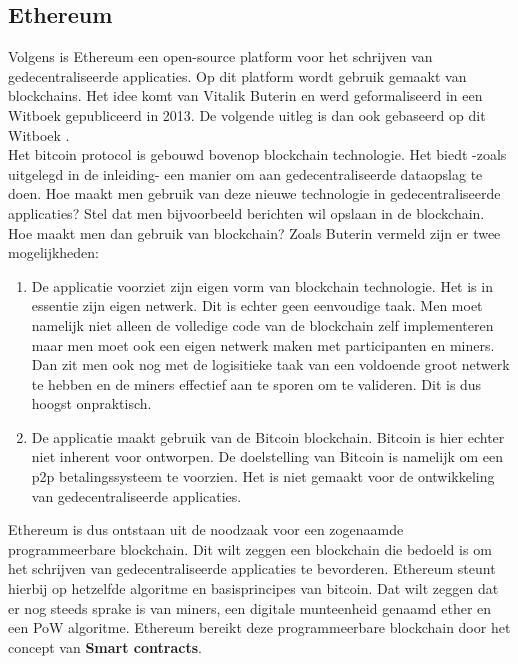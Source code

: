 \subsection{Ethereum}
Volgens \cite{EthFound2020} is Ethereum een open-source platform voor het schrijven van gedecentraliseerde applicaties. Op dit platform wordt gebruik gemaakt van blockchains. Het idee komt van Vitalik Buterin en werd geformaliseerd in een Witboek gepubliceerd in 2013. De volgende uitleg is dan ook gebaseerd op dit Witboek \cite{Buterin2015}.\\

Het bitcoin protocol is gebouwd bovenop blockchain technologie. Het biedt -zoals uitgelegd in de inleiding- een manier om aan gedecentraliseerde dataopslag te doen. Hoe maakt men gebruik van deze nieuwe technologie in gedecentraliseerde applicaties? Stel dat men bijvoorbeeld berichten wil opslaan in de blockchain. Hoe maakt men dan gebruik van blockchain? Zoals Buterin vermeld zijn er twee mogelijkheden:

\begin{enumerate}
\item De applicatie voorziet zijn eigen vorm van blockchain technologie. Het is in essentie zijn eigen netwerk. Dit is echter geen eenvoudige taak. Men moet namelijk niet alleen de volledige code van de blockchain zelf  implementeren maar men moet ook een eigen netwerk maken met participanten en miners. Dan zit men ook nog met de logisitieke taak van een voldoende groot netwerk te hebben en de miners effectief aan te sporen om te valideren. Dit is dus hoogst onpraktisch.\\
\item De applicatie maakt gebruik van de Bitcoin blockchain. Bitcoin is hier echter niet inherent voor ontworpen. De doelstelling van Bitcoin is namelijk om een p2p betalingssysteem te voorzien. Het is niet gemaakt voor de ontwikkeling van gedecentraliseerde applicaties.\\
\end{enumerate}

Ethereum is dus ontstaan uit de noodzaak voor een zogenaamde programmeerbare blockchain. Dit wilt zeggen een blockchain die bedoeld is om het schrijven van gedecentraliseerde applicaties te bevorderen. Ethereum steunt hierbij op hetzelfde algoritme en basisprincipes van bitcoin. Dat wilt zeggen dat er nog steeds sprake is van miners, een digitale munteenheid genaamd ether en een PoW algoritme. Ethereum bereikt deze programmeerbare blockchain door het concept van \textbf{Smart contracts}.

